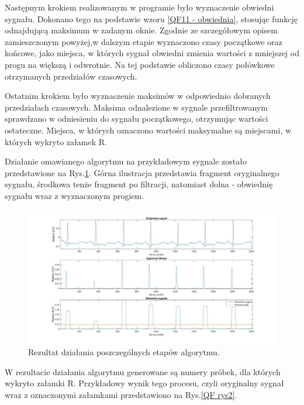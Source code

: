 \documentclass[10pt,a4paper]{article}
\begin{document}
Następnym krokiem realizowanym w programie było wyznaczenie obwiedni sygnału. Dokonano tego na podstawie wzoru \ref{QF11 - obwiednia}, stosując funkcję odnajdującą maksimum w zadanym oknie. Zgodnie ze szczegółowym opisem zamieszczonym powyżej,w dalszym etapie wyznaczono czasy początkowe oraz końcowe, jako miejsca, w których sygnał obwiedni zmienia wartości z mniejszej od progu na większą i odwrotnie. Na tej podstawie obliczono czasy połówkowe otrzymanych przedziałów czasowych.

Ostatnim krokiem było wyznaczenie maksimów w odpowiednio dobranych przedziałach czasowych. Maksima odnalezione w sygnale przefiltrowanym sprawdzano w odniesieniu do sygnału początkowego, otrzymując wartości ostateczne. Miejsca, w których oznaczono wartości maksymalne są miejscami, w których wykryto załamek R.

\newpage
Działanie omawianego algorytmu na przykładowym sygnale zostało przedstawione na Rys.\ref{QF rys1}. Górna ilustracja przedstawia fragment oryginalnego sygnału, środkowa tenże fragment po filtracji, natomiast dolna - obwiednię sygnału wraz z wyznaczonym progiem.

\medskip
\begin{figure}[h]
\centering
\includegraphics[width=\textwidth]{QF1}
\caption{Rezultat działania poszczególnych etapów algorytmu.}
\label{QF rys1}
\end{figure}

W rezultacie działania algorytmu generowane są numery próbek, dla których wykryto załamki R. Przykładowy wynik tego procesu, czyli oryginalny sygnał wraz z oznaczonymi załamkami przedstawiono na Rys.\ref{QF rys2}.
\end{document}
